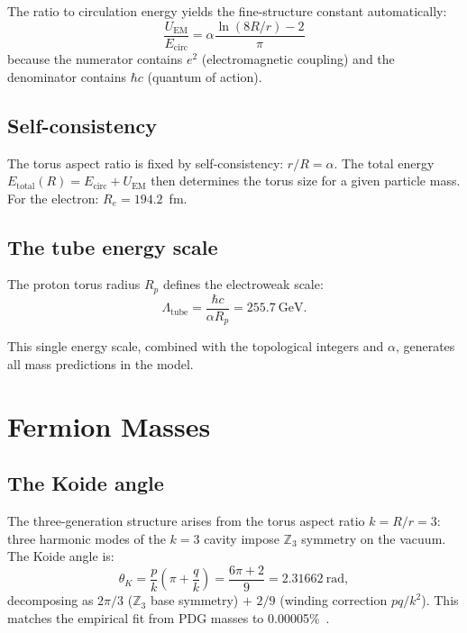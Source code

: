 \documentclass[11pt,a4paper]{article}
\begin{document}
The ratio to circulation energy yields the fine-structure constant automatically:
\begin{equation}
  \frac{U_{\text{EM}}}{E_{\text{circ}}} = \alpha\frac{\ln(8R/r) - 2}{\pi}
  \label{eq:alpha-ratio}
\end{equation}
because the numerator contains $e^2$ (electromagnetic coupling) and the denominator contains $\hbar c$ (quantum of action).

\subsection{Self-consistency}

The torus aspect ratio is fixed by self-consistency: $r/R = \alpha$. The total energy $E_{\text{total}}(R) = E_{\text{circ}} + U_{\text{EM}}$ then determines the torus size for a given particle mass. For the electron: $R_e = 194.2$~fm.

\subsection{The tube energy scale}

The proton torus radius $R_p$ defines the electroweak scale:
\begin{equation}
  \Lambda_{\text{tube}} = \frac{\hbar c}{\alpha R_p} = 255.7~\text{GeV}.
  \label{eq:tube-scale}
\end{equation}

This single energy scale, combined with the topological integers and $\alpha$, generates all mass predictions in the model.

\section{Fermion Masses}
\label{sec:fermion-masses}

\subsection{The Koide angle}

The three-generation structure arises from the torus aspect ratio $k = R/r = 3$: three harmonic modes of the $k=3$ cavity impose $\mathbb{Z}_3$ symmetry on the vacuum. The Koide angle is:
\begin{equation}
  \theta_K = \frac{p}{k}\left(\pi + \frac{q}{k}\right) = \frac{6\pi + 2}{9} = 2.31662~\text{rad},
  \label{eq:koide-angle}
\end{equation}
decomposing as $2\pi/3$ ($\mathbb{Z}_3$ base symmetry) $+$ $2/9$ (winding correction $pq/k^2$). This matches the empirical fit from PDG masses to 0.00005\%~\cite{koide1983}.
\end{document}
